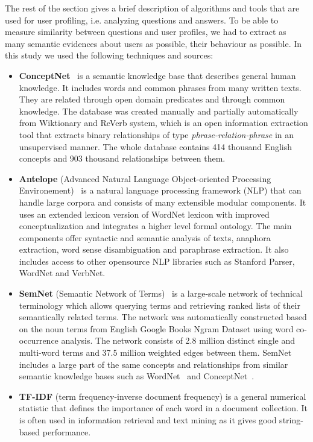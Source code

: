 \documentclass[conference]{IEEEtran}
\begin{document}
The rest of the section gives a brief description of algorithms and tools that are used for user profiling, i.e. analyzing questions and answers. To be able to measure similarity between questions and user profiles, we had to extract as many semantic evidences about users as possible, their behaviour as possible. In this study we used the following techniques and sources:
\begin{itemize}
	\item {\bf ConceptNet}~\cite{bib:conceptnet} is a semantic knowledge base that describes general human knowledge. It includes words and common phrases from many written texts. They are related through open domain predicates and through common knowledge. The database was created manually and partially automatically from Wiktionary and ReVerb system, which is an open information extraction tool that extracts binary relationships of type {\it phrase-relation-phrase} in an unsupervised manner. The whole database contains 414 thousand English concepts and 903 thousand relationships between them.
	\item {\bf Antelope} (Advanced Natural Language Object-oriented Processing Environement)~\cite{bib:antelope} is a natural language processing framework (NLP) that can handle large corpora and consists of many extensible modular components. It uses an extended lexicon version of WordNet lexicon with improved conceptualization and integrates a higher level formal ontology. The main components offer syntactic and semantic analysis of texts, anaphora extraction, word sense disambiguation and paraphrase extraction. It also includes access to other opensource NLP libraries such as Stanford Parser, WordNet and VerbNet.
	\item {\bf SemNet} (Semantic Network of Terms)~\cite{bib:semnet} is a large-scale network of technical terminology which allows querying terms and retrieving ranked lists of their semantically related terms. The network was automatically constructed based on the noun terms from English Google Books Ngram Dataset using word co-occurrence analysis. The network consists of 2.8 million distinct single and multi-word terms and 37.5 million weighted edges between them. SemNet includes a large part of the same concepts and relationships from similar semantic knowledge bases such as WordNet~\cite{bib:wordnet} and ConceptNet~\cite{bib:conceptnet}. 
	\item {\bf TF-IDF} (term frequency-inverse document frequency) is a general numerical statistic that defines the importance of each word in a document collection. It is often used in information retrieval and text mining as it gives good string-based performance. 
\end{itemize}
	
\end{document}
